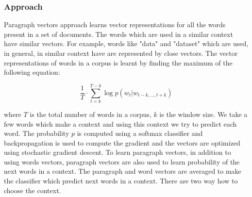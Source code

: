 \subsubsection{Approach}
Paragraph vectors approach learns vector representations for all the words present in a set of documents. The words which are used in a similar context have similar vectors. For example, words like "data" and "dataset" which are used, in general, in similar context have are represented by close vectors. The vector representations of words in a corpus is learnt by finding the maximum of the following equation:

\begin{equation}
\frac{1}{T} \cdot \sum_{t=k}^{T-k} \log p(w_t|w_{t-k,...,t+k})
\end{equation}

where $T$ is the total number of words in a corpus, $k$ is the window size. We take a few words which make a context and using this context we try to predict each word. The probability $p$ is computed using a softmax classifier and backpropagation is used to compute the gradient and the vectors are optimized using stochastic gradient descent. To learn paragraph vectors, in addition to using words vectors, paragraph vectors are also used to learn probability of the next words in a context. The paragraph and word vectors are averaged to make the classifier which predict next words in a context. There are two way how to choose the context. 

